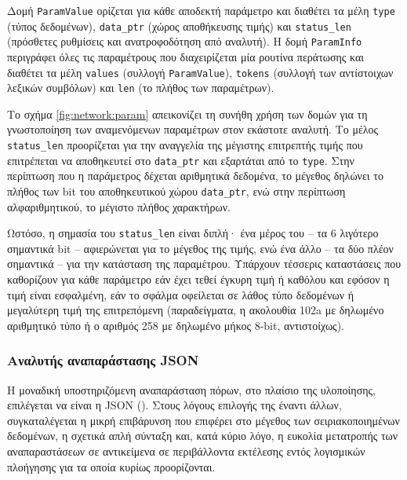 Δομή \verb~ParamValue~ ορίζεται για κάθε αποδεκτή παράμετρο και διαθέτει τα μέλη
\verb~type~ (τύπος δεδομένων), \verb~data_ptr~ (χώρος αποθήκευσης τιμής) και
\verb~status_len~ (πρόσθετες ρυθμίσεις και ανατροφοδότηση από αναλυτή). Η δομή
\verb~ParamInfo~ περιγράφει όλες τις παραμέτρους που διαχειρίζεται μία ρουτίνα
περάτωσης και διαθέτει τα μέλη \verb~values~ (συλλογή \verb~ParamValue~),
\verb~tokens~ (συλλογή των αντίστοιχων λεξικών συμβόλων) και \verb~len~ (το
πλήθος των παραμέτρων).

Το σχήμα \ref{fig:network:param} απεικονίζει τη συνήθη χρήση των δομών για τη
γνωστοποίηση των αναμενόμενων παραμέτρων στον εκάστοτε αναλυτή.
Το μέλος \verb~status_len~ προορίζεται για την αναγγελία της
μέγιστης επιτρεπτής τιμής που επιτρέπεται να αποθηκευτεί στο \verb~data_ptr~ και
εξαρτάται από το \verb~type~. Στην περίπτωση που η παράμετρος δέχεται αριθμητικά
δεδομένα, το μέγεθος δηλώνει το πλήθος των bit του αποθηκευτικού χώρου
\verb~data_ptr~, ενώ στην περίπτωση αλφαριθμητικού, το μέγιστο πλήθος
χαρακτήρων.

Ωστόσο, η σημασία του \verb~status_len~ είναι διπλή· ένα μέρος του -- τα 6
λιγότερο σημαντικά bit -- αφιερώνεται για το μέγεθος της τιμής, ενώ ένα άλλο --
τα δύο πλέον σημαντικά -- για την κατάσταση της παραμέτρου. Υπάρχουν τέσσερις
καταστάσεις που καθορίζουν για κάθε παράμετρο εάν έχει τεθεί έγκυρη τιμή ή
καθόλου και εφόσον η τιμή είναι εσφαλμένη, εάν το σφάλμα οφείλεται σε λάθος τύπο
δεδομένων ή μεγαλύτερη τιμή της επιτρεπόμενη (παραδείγματα, η ακολουθία 102a με
δηλωμένο αριθμητικό τύπο ή ο αριθμός 258 με δηλωμένο μήκος 8-bit, αντιστοίχως).


\subsubsection{Αναλυτής αναπαράστασης JSON}

Η μοναδική υποστηριζόμενη αναπαράσταση πόρων, στο πλαίσιο της υλοποίησης,
επιλέγεται να είναι η JSON (). Στους λόγους
επιλογής της έναντι άλλων, συγκαταλέγεται η μικρή επιβάρυνση που επιφέρει στο
μέγεθος των σειριακοποιημένων δεδομένων, η σχετικά απλή σύνταξη και, κατά κύριο
λόγο, η ευκολία μετατροπής των αναπαραστάσεων σε αντικείμενα σε περιβάλλοντα
εκτέλεσης εντός λογισμικών πλοήγησης για τα οποία κυρίως προορίζονται.

